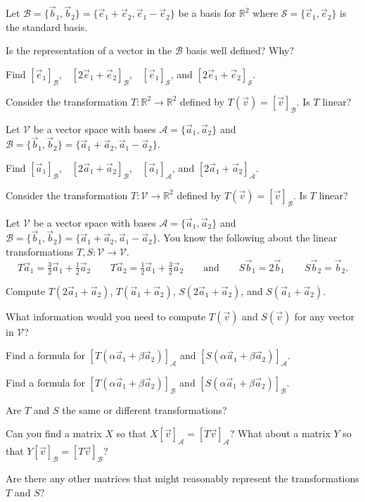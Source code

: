 \documentclass[14pt]{problemset}
\newcommand{\R}{\mathbb{R}}
\begin{document}
	\question
	Let $\mathcal B=\{\vec b_1,\vec b_2\}=\{\vec e_1+\vec e_2,\vec e_1-\vec e_2\}$ be a basis for $\R^2$ where $\mathcal S=
	\{\vec e_1,\vec e_2\}$ is the standard basis.
	\begin{parts}
		\item Is the representation of a vector in the $\mathcal B$ basis well defined? Why?
		\item Find $[\vec e_1]_{\mathcal B}$,\ \ $[2\vec e_1+\vec e_2]_{\mathcal B}$,\ \ $[\vec e_1]_{\mathcal S}$, and $[2\vec e_1+\vec e_2]_{\mathcal S}$.
		\item Consider the transformation $T:\R^2\to\R^2$ defined by $T(\vec v)=[\vec v]_{\mathcal B}$. Is $T$ linear?
	\end{parts}
	\question
	Let $\mathcal V$ be a vector space with bases $\mathcal A=\{\vec a_1,\vec a_2\}$ and
	$\mathcal B=\{\vec b_1,\vec b_2\}=\{\vec a_1+\vec a_2,\vec a_1-\vec a_2\}$.
	\begin{parts}
		\item Find $[\vec a_1]_{\mathcal B}$,\ \ $[2\vec a_1+\vec a_2]_{\mathcal B}$,\ \ $[\vec a_1]_{\mathcal A}$, and $[2\vec a_1+\vec a_2]_{\mathcal A}$.
		\item Consider the transformation $T:\mathcal V\to\R^2$ defined by $T(\vec v)=[\vec v]_{\mathcal B}$. Is $T$ linear?
	\end{parts}

	\newpage
	\question
	Let $\mathcal V$ be a vector space with bases $\mathcal A=\{\vec a_1,\vec a_2\}$ and
	$\mathcal B=\{\vec b_1,\vec b_2\}=\{\vec a_1+\vec a_2,\vec a_1-\vec a_2\}$. You know the following
	about the linear transformations
	$T,S:\mathcal V\to\mathcal V$.
	\[
		T\vec a_1=\tfrac{3}{2}\vec a_1+\tfrac{1}{2}\vec a_2\qquad 
		T\vec a_2=\tfrac{1}{2}\vec a_1+\tfrac{3}{2}\vec a_2\qquad\text{and}
		\qquad
		S \vec b_1 = 2\vec b_1\qquad
		S\vec b_2 = \vec b_2.
	\]
	\begin{parts}
		\item Compute $T(2\vec a_1+\vec a_2)$, $T(\vec a_1+\vec a_2)$, $S(2\vec a_1+\vec a_2)$, and $S(\vec a_1+\vec a_2)$.
		\item What information would you need to compute $T(\vec v)$ and $S(\vec v)$ for any vector in $\mathcal V$?
		\item Find a formula for $[T(\alpha\vec a_1+\beta\vec a_2)]_{\mathcal A}$ and $[S(\alpha\vec a_1+\beta\vec a_2)]_{\mathcal A}$.
		\item Find a formula for $[T(\alpha\vec a_1+\beta\vec a_2)]_{\mathcal B}$ and $[S(\alpha\vec a_1+\beta\vec a_2)]_{\mathcal B}$.
		\item Are $T$ and $S$ the same or different transformations?
		\item Can you find a matrix $X$ so that $X[\vec v]_{\mathcal A} = [T\vec v]_{\mathcal A}$? What
			about a matrix $Y$ so that $Y[\vec v]_{\mathcal B} = [T\vec v]_{\mathcal B}$?
		\item Are there any other matrices that might reasonably represent the transformations $T$ and $S$?
	\end{parts}
\end{document}

